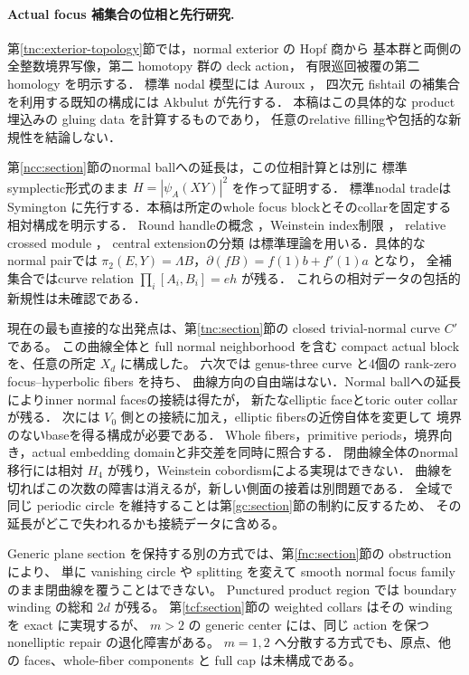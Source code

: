 \documentclass[11pt,a4paper]{article}
\theoremstyle{definition}
\begin{document}
\paragraph{Actual focus 補集合の位相と先行研究.}
第\ref{tnc:exterior-topology}節では，normal exterior の Hopf 商から
基本群と両側の全整数境界写像，第二 homotopy 群の deck action，
有限巡回被覆の第二 homology を明示する．
標準 nodal 模型には Auroux \cite[Section~5.1]{auroux-local}，
四次元 fishtail の補集合を利用する既知の構成には
Akbulut \cite[Introduction]{akbulut-double-fishtail}が先行する．
本稿はこの具体的な product 埋込みの gluing data を計算するものであり，
任意のrelative fillingや包括的な新規性を結論しない．

第\ref{ncc:section}節のnormal ballへの延長は，この位相計算とは別に
標準symplectic形式のまま $H=|\psi_A(XY)|^2$ を作って証明する．
標準nodal tradeはSymington \cite[Section~6.1, Lemma~6.3 and Theorem~6.5]{symington}
に先行する．本稿は所定のwhole focus blockとそのcollarを固定する相対構成を明示する．
Round handleの概念 \cite{asimov-round}，Weinstein index制限
\cite[Section~1.1]{cieliebak-eliashberg-flexible-local}，
relative crossed module \cite[Section~2]{brown-relative-pi2}，
central extensionの分類 \cite[Section~2]{conrad-group-extensions}
は標準理論を用いる．具体的なnormal pairでは
$\pi_2(E,Y)=\Lambda B$，$\partial(fB)=f(1)b+f'(1)a$ となり，
全補集合ではcurve relation $\prod_i[A_i,B_i]=eh$ が残る．
これらの相対データの包括的新規性は未確認である．

現在の最も直接的な出発点は、第\ref{tnc:section}節の closed trivial-normal curve $C'$ である。
この曲線全体と full normal neighborhood を含む compact actual block を、任意の所定 $X_d$ に構成した。
六次では genus-three curve と4個の rank-zero focus--hyperbolic fibers を持ち、
曲線方向の自由端はない．Normal ballへの延長によりinner normal facesの接続は得たが，
新たなelliptic faceとtoric outer collarが残る．
次には $V_0$ 側との接続に加え，elliptic fibersの近傍自体を変更して
境界のないbaseを得る構成が必要である．
Whole fibers，primitive periods，境界向き，actual embedding domainと非交差を同時に照合する．
閉曲線全体のnormal移行には相対 $H_4$ が残り，Weinstein cobordismによる実現はできない．
曲線を切ればこの次数の障害は消えるが，新しい側面の接着は別問題である．
全域で同じ periodic circle を維持することは第\ref{gc:section}節の制約に反するため、
その延長がどこで失われるかも接続データに含める。

Generic plane section を保持する別の方式では、第\ref{fnc:section}節の obstruction により、
単に vanishing circle や splitting を変えて smooth normal focus family のまま閉曲線を覆うことはできない。
Punctured product region では boundary winding の総和 $2d$ が残る。
第\ref{tcf:section}節の weighted collars はその winding を exact に実現するが、
$m>2$ の generic center には、同じ action を保つ nonelliptic repair の退化障害がある。
$m=1,2$ へ分散する方式でも、原点、他の faces、whole-fiber components と full cap は未構成である。
\end{document}
